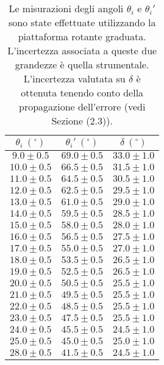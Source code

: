 \begin{table}[H]
	\centering
	\begin{tabular}{|c|c|c|}
		\hline
		$\theta_i \ (^\circ)$ & $\theta_i' \ (^\circ)$ & $\delta \ (^\circ)$ \\
		\hline
		$9.0\pm 0.5$ & $69.0\pm 0.5$ & $33.0\pm 1.0$ \\
		\hline
		$10.0\pm 0.5$ & $66.5\pm 0.5$ & $31.5\pm 1.0$ \\
		\hline
		$11.0\pm 0.5$ & $64.5\pm 0.5$ & $30.5\pm 1.0$ \\
		\hline
		$12.0\pm 0.5$ & $62.5\pm 0.5$ & $29.5\pm 1.0$ \\
		\hline
		$13.0\pm 0.5$ & $61.0\pm 0.5$ & $29.0\pm 1.0$ \\
		\hline
		$14.0\pm 0.5$ & $59.5\pm 0.5$ & $28.5\pm 1.0$ \\
		\hline
		$15.0\pm 0.5$ & $58.0\pm 0.5$ & $28.0\pm 1.0$ \\
		\hline
		$16.0\pm 0.5$ & $56.5\pm 0.5$ & $27.5\pm 1.0$ \\
		\hline
		$17.0\pm 0.5$ & $55.0\pm 0.5$ & $27.0\pm 1.0$ \\
		\hline
		$18.0\pm 0.5$ & $53.5\pm 0.5$ & $26.5\pm 1.0$ \\
		\hline
		$19.0\pm 0.5$ & $52.5\pm 0.5$ & $26.5\pm 1.0$ \\
		\hline
		$20.0\pm 0.5$ & $50.5\pm 0.5$ & $25.5\pm 1.0$ \\
		\hline
		$21.0\pm 0.5$ & $49.5\pm 0.5$ & $25.5\pm 1.0$ \\
		\hline
		$22.0\pm 0.5$ & $48.5\pm 0.5$ & $25.5\pm 1.0$ \\
		\hline
		$23.0\pm 0.5$ & $47.5\pm 0.5$ & $25.5\pm 1.0$ \\
		\hline
		$24.0\pm 0.5$ & $45.5\pm 0.5$ & $24.5\pm 1.0$ \\
		\hline
		$25.0\pm 0.5$ & $45.0\pm 0.5$ & $25.0\pm 1.0$ \\
		\hline
		$28.0\pm 0.5$ & $41.5\pm 0.5$ & $24.5\pm 1.0$ \\
		\hline
	\end{tabular}
	\caption{Le misurazioni degli angoli $\theta_i$ e $\theta_i'$ sono state effettuate utilizzando la piattaforma rotante graduata. L'incertezza associata a queste due grandezze è quella strumentale. L'incertezza valutata su $\delta$ è ottenuta tenendo conto della propagazione dell'errore (vedi Sezione (2.3)).}
	\label{tab:}
\end{table}
